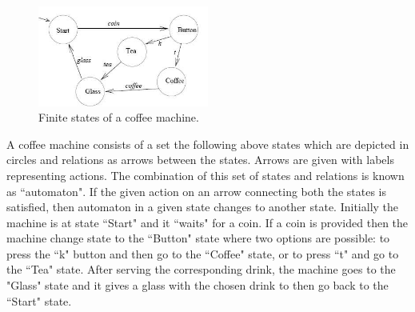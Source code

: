\documentclass[a4paper,12pt]{extarticle}
\begin{document}
\begin{figure}[h!]
\centering
  \includegraphics[width= 0.5\textwidth]{flower.png}
\caption{Finite states of a coffee machine.}
\end{figure}
 \textrm{A coffee machine consists of a set the following above states which are depicted in circles and relations as arrows between the states. Arrows are given with labels representing actions. The combination of this set of states and relations is known as ``automaton".  If the given action on an arrow connecting both the states is satisfied, then automaton in a given state changes to another state. 
Initially the machine is at state ``Start" and it ``waits" for a coin. If a coin is provided then the machine change state to the ``Button" state where two options are possible: to press the ``k" button and then go to the ``Coffee" state, or to press ``t" and go to the ``Tea" state. After serving the corresponding drink, the machine goes to the "Glass" state and it gives a glass with the chosen drink to then go back to the ``Start" state.}
\end{document}
